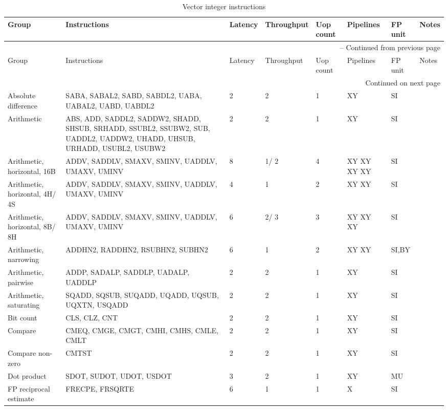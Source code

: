 \begin{longtable}{|p{1in}|p{1in}|l|l|l|p{1in}|l|p{1in}|}
\caption{Vector integer instructions} \\
\hline
Group & Instructions & Latency & Throughput & Uop count & Pipelines & FP unit & Notes\\
\hline
\endfirsthead
\hline
\multicolumn{8}{|r|}{{\tablename\ \thetable{} -- Continued from previous page}} \\
\hline
Group & Instructions & Latency & Throughput & Uop count & Pipelines & FP unit & Notes\\
\hline
\endhead
\hline
\multicolumn{8}{|r|}{{Continued on next page}} \\
\hline
\endfoot
\hline
\endlastfoot
Absolute difference & SABA, SABAL{{2}}, SABD, SABDL{{2}}, UABA, UABAL{{2}}, UABD, UABDL{{2}} & 2 & 2 & 1 & XY & SI & \\
\hline
Arithmetic & ABS, ADD, SADDL{{2}}, SADDW{{2}}, SHADD, SHSUB, SRHADD, SSUBL{{2}}, SSUBW{{2}}, SUB, UADDL{{2}}, UADDW{{2}}, UHADD, UHSUB, URHADD, USUBL{{2}}, USUBW{{2}} & 2 & 2 & 1 & XY & SI & \\
\hline
Arithmetic, horizontal, 16B & ADDV, SADDLV, SMAXV, SMINV, UADDLV, UMAXV, UMINV & 8 & 1/ 2 & 4 & XY XY XY XY & SI & \\
\hline
Arithmetic, horizontal, 4H/ 4S & ADDV, SADDLV, SMAXV, SMINV, UADDLV, UMAXV, UMINV & 4 & 1 & 2 & XY XY & SI & \\
\hline
Arithmetic, horizontal, 8B/ 8H & ADDV, SADDLV, SMAXV, SMINV, UADDLV, UMAXV, UMINV & 6 & 2/ 3 & 3 & XY XY XY & SI & \\
\hline
Arithmetic, narrowing & ADDHN{{2}}, RADDHN{{2}}, RSUBHN{{2}}, SUBHN{{2}} & 6 & 1 & 2 & XY XY & SI,BY & \\
\hline
Arithmetic, pairwise & ADDP, SADALP, SADDLP, UADALP, UADDLP & 2 & 2 & 1 & XY & SI & \\
\hline
Arithmetic, saturating & SQADD, SQSUB, SUQADD, UQADD, UQSUB, UQXTN, USQADD & 2 & 2 & 1 & XY & SI & \\
\hline
Bit count & CLS, CLZ, CNT & 2 & 2 & 1 & XY & SI & \\
\hline
Compare & CMEQ, CMGE, CMGT, CMHI, CMHS, CMLE, CMLT & 2 & 2 & 1 & XY & SI & \\
\hline
Compare non-zero & CMTST & 2 & 2 & 1 & XY & SI & \\
\hline
Dot product & SDOT, SUDOT, UDOT, USDOT & 3 & 2 & 1 & XY & MU & \\
\hline
FP reciprocal estimate & FRECPE, FRSQRTE & 6 & 1 & 1 & X & SI & \\

\end{longtable}
